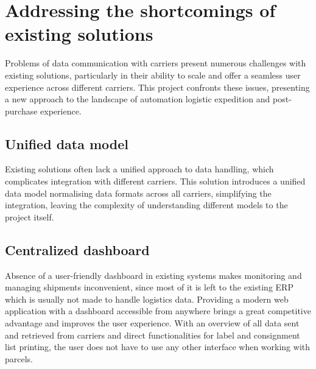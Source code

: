 \section{Addressing the shortcomings of existing solutions}
\label{sec:addressing-shortcoming-existing-solutions}

Problems of data communication with carriers present numerous challenges with existing solutions, particularly in their ability to scale and offer a seamless user experience across different carriers.
This project confronts these issues, presenting a new approach to the landscape of automation logistic expedition and post-purchase experience.

\subsection{Unified data model}
Existing solutions often lack a unified approach to data handling, which complicates integration with different carriers. 
This solution introduces a unified data model normalising data formats across all carriers, simplifying the integration, leaving the complexity of understanding different models to the project itself.

\subsection{Centralized dashboard}
Absence of a user-friendly dashboard in existing systems makes monitoring and managing shipments inconvenient, since most of it is left to the existing \ac{ERP} which is usually not made to handle logistics data.
Providing a modern web application with a dashboard accessible from anywhere brings a great competitive advantage and improves the user experience. 
With an overview of all data sent and retrieved from carriers and direct functionalities for label and consignment list printing, the user does not have to use any other interface when working with parcels.

